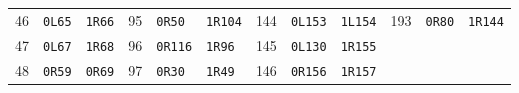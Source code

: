 \begin{center}
\begin{tabular}{@{}rll@{\quad}rll@{\quad}rll@{\quad}rll@{}}
46&\texttt{0L65}&\texttt{1R66}&95&\texttt{0R50}&\texttt{1R104}&144&\texttt{0L153}&\texttt{1L154}&193&\texttt{0R80}&\texttt{1R144}\\
47&\texttt{0L67}&\texttt{1R68}&96&\texttt{0R116}&\texttt{1R96}&145&\texttt{0L130}&\texttt{1R155}&&&\\
48&\texttt{0R59}&\texttt{0R69}&97&\texttt{0R30}&\texttt{1R49}&146&\texttt{0R156}&\texttt{1R157}&&&\\
\bottomrule\end{tabular}\end{center}
